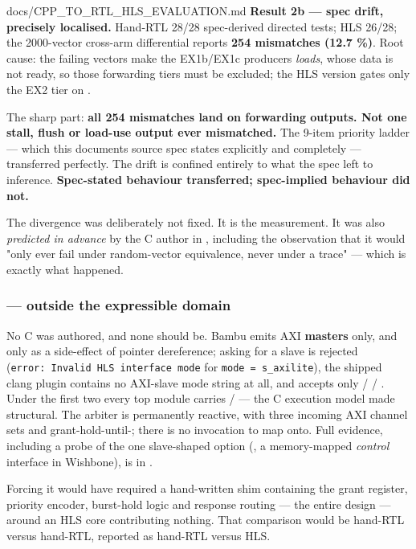\begin{relocated}{docs/CPP_TO_RTL_HLS_EVALUATION.md}
\textbf{Result 2b --- spec drift, precisely localised.} Hand-RTL 28/28
spec-derived directed tests; HLS 26/28; the 2000-vector cross-arm
differential reports \textbf{254 mismatches (12.7 \%)}. Root cause: the
failing vectors make the EX1b/EX1c producers \emph{loads}, whose data is
not ready, so those forwarding tiers must be excluded; the HLS version
gates only the EX2 tier on .

The sharp part: \textbf{all 254 mismatches land on forwarding outputs.
Not one stall, flush or load-use output ever mismatched.} The 9-item
priority ladder --- which this document\textquotesingle s source spec
states explicitly and completely --- transferred perfectly. The drift is
confined entirely to what the spec left to inference.
\textbf{Spec-stated behaviour transferred; spec-implied behaviour did
not.}

The divergence was deliberately not fixed. It is the measurement. It was
also \emph{predicted in advance} by the C author in
, including the observation that it would "only
ever fail under random-vector equivalence, never under a trace" ---
which is exactly what happened.

\subsubsection{\texorpdfstring{ --- outside
the expressible domain}{--- outside the expressible domain}}\label{tm:dec:cpp-to-rtl-hls-evaluation:3-rv32i-cache-arbiter-outside-the-expressible-domain}

No C was authored, and none should be. Bambu emits AXI \textbf{masters}
only, and only as a side-effect of pointer dereference; asking for a
slave is rejected
(\texttt{error:\allowbreak{}\ Invalid\ HLS\ interface\ mode} for
\texttt{mode\ =\allowbreak{}\ s\_\allowbreak{}axilite}), the shipped
clang plugin contains no AXI-slave mode string at all, and
 accepts only  /  /
. Under the first two every top module carries
/ --- the C execution model made
structural. The arbiter is permanently reactive, with three incoming AXI
channel sets and grant-hold-until-; there is no invocation
to map onto. Full evidence, including a probe of the one slave-shaped
option (, a memory-mapped \emph{control} interface in
Wishbone), is in .

Forcing it would have required a hand-written shim containing the grant
register, priority encoder, burst-hold logic and response routing ---
the entire design --- around an HLS core contributing nothing. That
comparison would be hand-RTL versus hand-RTL, reported as hand-RTL
versus HLS.


\end{relocated}
